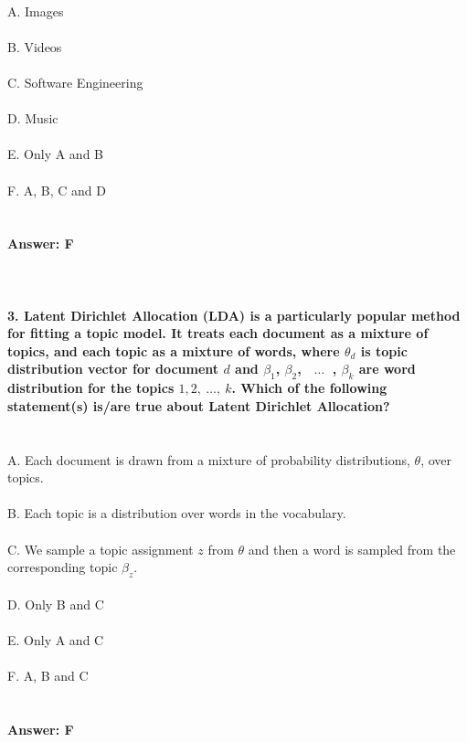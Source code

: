 \documentclass[prl,twocolumn,showpacs,preprintnumbers,superscriptaddress]{revtex4}
\theoremstyle{plain}
\theoremstyle{definition}
\begin{document}
\begin{widetext}
\\
\noindent A. Images
\\
\\
B. Videos
\\
\\
C. Software Engineering
\\
\\
D. Music
\\
\\
E. Only A and B
\\
\\
F. A, B, C and D
\\
\\
\\
\textbf{Answer: F}
\\
\\
\\
\\
\textbf{3. Latent Dirichlet Allocation (LDA) is a particularly popular method for fitting a topic model. It treats each document as a mixture of topics, and each topic as a mixture of words, where $\theta_{d}$ is topic distribution vector for document $d$ and $\beta_{1}$, $\beta_{2}$, $\ $ $\ldots$ $\ $, $\beta_{k}$ are word distribution for the topics ${1}, {2}, \  \ldots , \  {k}$. Which of the following statement(s) is/are true about Latent Dirichlet Allocation?}
\\
\\
\\
\noindent A. Each document is drawn from a mixture of probability distributions, $\theta$, over topics.
\\
\\
B. Each topic is a distribution over words in the vocabulary.
\\
\\
C. We sample a topic assignment $z$ from  $\theta$ and then a word is sampled from
the corresponding topic $\beta_{z}$.
\\
\\
D. Only B and C
\\
\\
E. Only A and C
\\
\\
F. A, B and C
\\
\\
\\
\textbf{Answer: F}
\\

\end{widetext}
\end{document}

